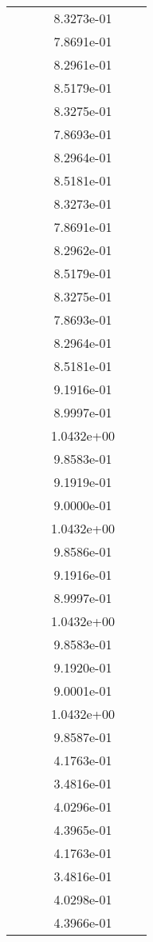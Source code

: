 \begin{xltabular}{\textwidth}{r|rS[table-format=1.3e+2]S[table-format=1.4e+2]S[table-format=1.4e+2]S[table-format=-1.5]}
&  &  & 8.3273e-01 & & \\
&  &  & 7.8691e-01 & & \\
&  &  & 8.2961e-01 & & \\
&  &  & 8.5179e-01 & & \\
&  &  & 8.3275e-01 & & \\
&  &  & 7.8693e-01 & & \\
&  &  & 8.2964e-01 & & \\
&  &  & 8.5181e-01 & & \\
&  &  & 8.3273e-01 & & \\
&  &  & 7.8691e-01 & & \\
&  &  & 8.2962e-01 & & \\
&  &  & 8.5179e-01 & & \\
&  &  & 8.3275e-01 & & \\
&  &  & 7.8693e-01 & & \\
&  &  & 8.2964e-01 & & \\
&  &  & 8.5181e-01 & & \\
&  &  & 9.1916e-01 & & \\
&  &  & 8.9997e-01 & & \\
&  &  & 1.0432e+00 & & \\
&  &  & 9.8583e-01 & & \\
&  &  & 9.1919e-01 & & \\
&  &  & 9.0000e-01 & & \\
&  &  & 1.0432e+00 & & \\
&  &  & 9.8586e-01 & & \\
&  &  & 9.1916e-01 & & \\
&  &  & 8.9997e-01 & & \\
&  &  & 1.0432e+00 & & \\
&  &  & 9.8583e-01 & & \\
&  &  & 9.1920e-01 & & \\
&  &  & 9.0001e-01 & & \\
&  &  & 1.0432e+00 & & \\
&  &  & 9.8587e-01 & & \\
&  &  & 4.1763e-01 & & \\
&  &  & 3.4816e-01 & & \\
&  &  & 4.0296e-01 & & \\
&  &  & 4.3965e-01 & & \\
&  &  & 4.1763e-01 & & \\
&  &  & 3.4816e-01 & & \\
&  &  & 4.0298e-01 & & \\
&  &  & 4.3966e-01 & & \\

\end{xltabular}

